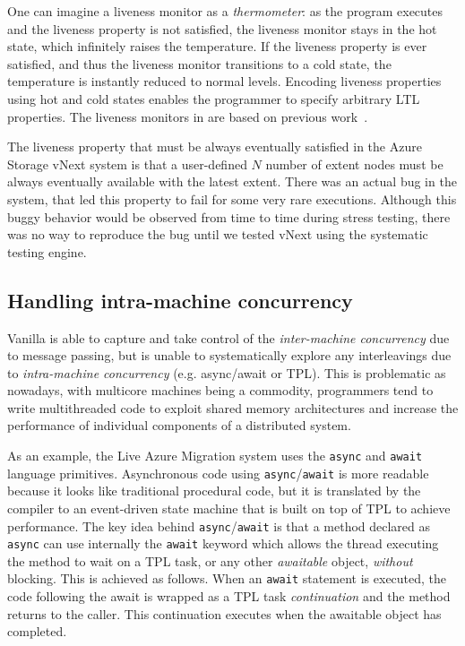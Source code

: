 One can imagine a liveness monitor as a \emph{thermometer}: as the program executes and the liveness property is not satisfied, the liveness monitor stays in the hot state, which infinitely raises the temperature. If the liveness property is ever satisfied, and thus the liveness monitor transitions to a cold state, the temperature is instantly reduced to normal levels. Encoding liveness properties using hot and cold states enables the programmer to specify arbitrary LTL properties. The liveness monitors in \psharp are based on previous work~\cite{?}. 


The liveness property that must be always eventually satisfied in the Azure Storage vNext system is that a user-defined $N$ number of extent nodes must be always eventually available with the latest extent. There was an actual bug in the system, that led this property to fail for some very rare executions. Although this buggy behavior would be observed from time to time during stress testing, there was no way to reproduce the bug until we tested vNext using the \psharp systematic testing engine.


\subsection{Handling intra-machine concurrency}
\label{sec:psharp:async}

Vanilla \psharp is able to capture and take control of the \emph{inter-machine concurrency} due to message passing, but is unable to systematically explore any interleavings due to \emph{intra-machine concurrency} (e.g. async/await or TPL). This is problematic as nowadays, with multicore machines being a commodity, programmers tend to write multithreaded code to exploit shared memory architectures and increase the performance of individual components of a distributed system.

As an example, the Live Azure Migration system uses the \texttt{async} and \texttt{await}  language primitives. Asynchronous code using \texttt{async}/\texttt{await} is more readable because it looks like traditional procedural code, but it is translated by the compiler to an event-driven state machine that is built on top of TPL to achieve performance. The key idea behind \texttt{async}/\texttt{await} is that a method declared as \texttt{async} can use internally the \texttt{await} keyword which allows the thread executing the method to wait on a TPL task, or any other \emph{awaitable} object, \emph{without} blocking. This is achieved as follows. When an \texttt{await} statement is executed, the code following the await is wrapped as a TPL task \emph{continuation} and the method returns to the caller. This continuation executes when the awaitable object has completed.


